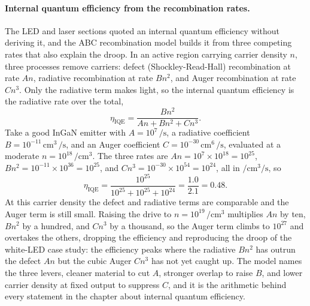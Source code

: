 \paragraph{Internal quantum efficiency from the recombination rates.}
The LED and laser sections quoted an internal quantum efficiency without deriving
it, and the ABC recombination model builds it from three competing rates that
also explain the droop. In an active region carrying carrier density $n$, three
processes remove carriers: defect (Shockley-Read-Hall) recombination at rate
$An$, radiative recombination at rate $Bn^{2}$, and Auger recombination at rate
$Cn^{3}$. Only the radiative term makes light, so the internal quantum efficiency
is the radiative rate over the total,
\[
\eta_{\text{IQE}} = \frac{Bn^{2}}{An + Bn^{2} + Cn^{3}}.
\]
Take a good InGaN emitter with $A = 10^{7}\,\si{\per\second}$, a radiative
coefficient $B = 10^{-11}\,\text{cm}^{3}\,\si{\per\second}$, and an Auger
coefficient $C = 10^{-30}\,\text{cm}^{6}\,\si{\per\second}$, evaluated at a
moderate $n = 10^{18}\,\si{\per\centi\meter\cubed}$.
The three rates are $An = 10^{7}\times 10^{18} = 10^{25}$, $Bn^{2} = 10^{-11}
\times 10^{36} = 10^{25}$, and $Cn^{3} = 10^{-30}\times 10^{54} = 10^{24}$, all in
$\si{\per\centi\meter\cubed\per\second}$, so
\[
\eta_{\text{IQE}} = \frac{10^{25}}{10^{25} + 10^{25} + 10^{24}}
= \frac{1.0}{2.1} = 0.48.
\]
At this carrier density the defect and radiative terms are comparable and the
Auger term is still small. Raising the drive to $n = 10^{19}\,\si{\per\centi
\meter\cubed}$ multiplies $An$ by ten, $Bn^{2}$ by a hundred, and $Cn^{3}$ by a
thousand, so the Auger term climbs to $10^{27}$ and overtakes the others, dropping
the efficiency and reproducing the droop of the white-LED case study: the
efficiency peaks where the radiative $Bn^{2}$ has outrun the defect $An$ but the
cubic Auger $Cn^{3}$ has not yet caught up. The model names the three levers,
cleaner material to cut $A$, stronger overlap to raise $B$, and lower carrier
density at fixed output to suppress $C$, and it is the arithmetic behind every
statement in the chapter about internal quantum efficiency.

